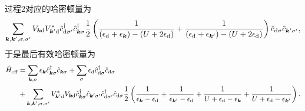 \documentclass[hyperref, UTF8, a4paper]{ctexart}
\begin{document}
过程2对应的哈密顿量为
\[
    \sum_{\vb*{k}, \vb*{k}', \sigma, \sigma'} V_{\vb*{k} \text{d}} V_{\vb*{k}' \text{d}}^*
    \hat{c}^\dagger_{\text{d} \sigma'} \hat{c}^\dagger_{\vb*{k} \sigma}
    \frac{1}{2} \left(
        \frac{1}{(\epsilon_\text{d} + \epsilon_{\vb*{k}}) - (U + 2 \epsilon_{\text{d}})} + \frac{1}{(\epsilon_\text{d} + \epsilon_{\vb*{k}'}) - (U + 2 \epsilon_{\text{d}})}
    \right)
    \hat{c}_{\text{d} \sigma} \hat{c}_{\vb*{k}' \sigma'},
\]
于是最后有效哈密顿量为
\begin{equation}
    \begin{aligned}
        \hat{H}_\text{eff} &= \sum_{\vb*{k}, \sigma} \epsilon_{\vb*{k}} \hat{c}_{\vb*{k}\sigma}^\dagger \hat{c}_{\vb*{k} \sigma} + \sum_\sigma \epsilon_\text{d} \hat{c}_{\text{d}\sigma}^\dagger \hat{c}_{\text{d} \sigma} \\
        & + \sum_{\vb*{k}, \vb*{k}', \sigma, \sigma'} V_{\vb*{k}' \text{d}}^* V_{\vb*{k} \text{d}} \hat{c}^\dagger_{\vb*{k} \sigma} \hat{c}_{\vb*{k}' \sigma'} \hat{c}^\dagger_{\text{d} \sigma'} \hat{c}_{\text{d} \sigma} 
        \frac{1}{2} \left( \frac{1}{\epsilon_{\vb*{k}}- \epsilon_\text{d}} + \frac{1}{\epsilon_{\vb*{k}'} - \epsilon_\text{d}} + \frac{1}{U + \epsilon_\text{d} - \epsilon_{\vb*{k}}} + \frac{1}{U + \epsilon_\text{d} - \epsilon_{\vb*{k}'}} \right).
    \end{aligned}
    \label{eq:effective-anderson}
\end{equation}
\end{document}
